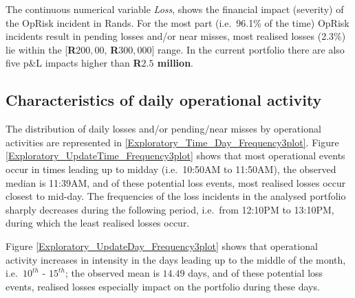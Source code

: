 \documentclass{DissertateUSU}
\begin{document}
The continuous numerical variable \emph{Loss}, shows the financial
impact (severity) of the OpRisk incident in Rands. For the most part
(i.e.~96.1\% of the time) OpRisk incidents result in pending losses
and/or near misses, most realised losses (2.3\%) lie within the
{[}\textbf{R$200,00$}, \textbf{R$300,000$}{]} range. In the current
portfolio there are also five p\&L impacts higher than
\textbf{R$2.5$ million}.\medskip

\subsection{Characteristics of daily operational activity}

The distribution of daily losses and/or pending/near misses by
operational activities are represented in
\ref{Exploratory_Time_Day_Frequency3plot}. Figure
\ref{Exploratory_UpdateTime_Frequency3plot} shows that most operational
events occur in times leading up to midday (i.e.~10:50AM to 11:50AM),
the observed median is 11:39AM, and of these potential loss events, most
realised losses occur closest to mid-day. The frequencies of the loss
incidents in the analysed portfolio sharply decreases during the
following period, i.e.~from 12:10PM to 13:10PM, during which the least
realised losses occur.\medskip

Figure \ref{Exploratory_UpdateDay_Frequency3plot} shows that operational
activity increases in intensity in the days leading up to the middle of
the month, i.e.~\(10^{th}\) - \(15^{th}\); the observed mean is
\(14.49\) days, and of these potential loss events, realised losses
especially impact on the portfolio during these days.

\singlespacing

\doublespacing
\end{document}
